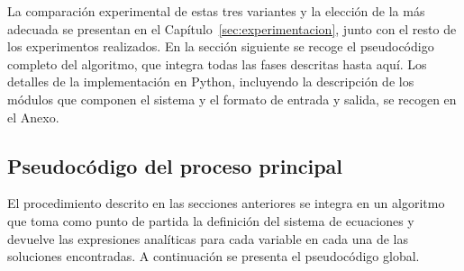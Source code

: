 \documentclass[12pt,a4paper]{article} \usepackage[utf8]{inputenc} \usepackage[spanish]{babel} \usepackage{amsmath, amssymb, amsthm} \usepackage{bm} \usepackage{float} \usepackage{longtable} \usepackage[hidelinks]{hyperref}
\begin{document}
La comparación experimental de estas tres variantes y la elección de la
más adecuada se presentan en el Capítulo~\ref{sec:experimentacion},
junto con el resto de los experimentos realizados. En la sección
siguiente se recoge el pseudocódigo completo del algoritmo, que integra
todas las fases descritas hasta aquí. Los detalles de la implementación
en Python, incluyendo la descripción de los módulos que componen el
sistema y el formato de entrada y salida, se recogen en el Anexo.



\subsection{Pseudocódigo del proceso principal}
\label{sec:pseudocodigo_principal}

El procedimiento descrito en las secciones anteriores se integra en un algoritmo que toma como punto de partida la definición del sistema de ecuaciones y devuelve las expresiones analíticas para cada variable en cada una de las soluciones encontradas. A continuación se presenta el pseudocódigo global.
\end{document}
